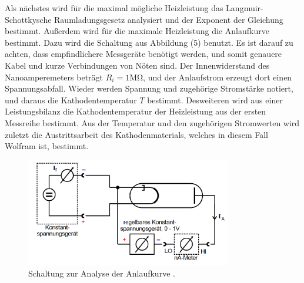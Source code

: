 Als nächstes wird für die maximal mögliche Heizleistung das Langmuir-Schottkysche Raumladungsgesetz analysiert und der Exponent der Gleichung bestimmt.
Außerdem wird für die maximale Heizleistung die Anlaufkurve bestimmt. Dazu wird die Schaltung aus Abbildung (5) benutzt. Es ist darauf zu achten, dass empfindlichere Messgeräte benötigt werden, und somit genauere Kabel und kurze Verbindungen von Nöten sind.
Der Innenwiderstand des Nanoamperemeters beträgt $R_i = 1 \si{\mega\ohm}$, und der Anlaufstrom erzeugt dort einen Spannungsabfall.
Wieder werden Spannung und zugehörige Stromstärke notiert, und daraus die Kathodentemperatur $T$ bestimmt.
Desweiteren wird aus einer Leistungsbilanz die Kathodentemperatur der Heizleistung aus der ersten Messreihe bestimmt.
Aus der Temperatur und den zugehörigen Stromwerten wird zuletzt die Austrittsarbeit des Kathodenmaterials, welches in diesem Fall Wolfram ist, bestimmt.
\begin{figure}[H]
  \centering
  \includegraphics[width=0.8\textwidth]{2.png}
  \caption{Schaltung zur Analyse der Anlaufkurve \cite{kent}.}
  \label{fig:aufbau}
\end{figure}